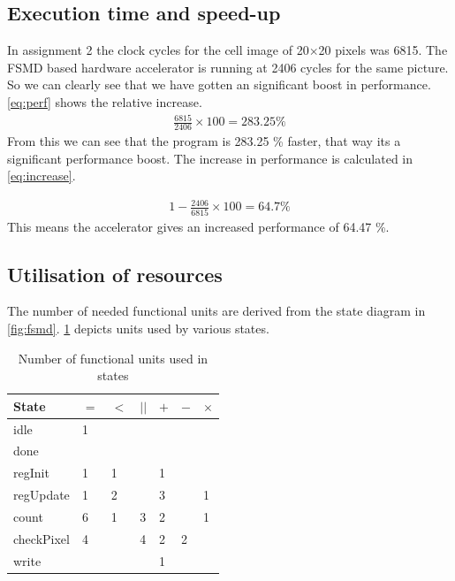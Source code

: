 \documentclass[a4paper, english]{article}
\numberwithin{equation}{section}
\begin{document}
\subsection{Execution time and speed-up}
In assignment 2 the clock cycles for the cell image of 20\(\times\)20 pixels was 6815. The FSMD based hardware accelerator is running at 2406 cycles for the same picture. So we can clearly see that we have gotten an significant boost in performance. \cref{eq:perf} shows the relative increase.
\begin{align}
\frac{6815}{2406} \times 100 = 283.25 \% \label{eq:perf}
\end{align}\newline
From this we can see that the program is 283.25 \% faster, that way its a significant performance boost. The increase in performance is calculated in \cref{eq:increase}.

\begin{align}
1 - \frac{2406}{6815} \times 100 = 64.7 \% \label{eq:increase}
\end{align}\newline
This means the accelerator gives an increased performance of 64.47 \%.

\subsection{Utilisation of resources}
The number of needed functional units are derived from the state diagram in \cref{fig:fsmd}. \cref{tbl:funcunits} depicts units used by various states.
\begin{table}[H]
    \centering
    \caption{Number of functional units used in states}\label{tbl:funcunits}
    \begin{tabular}{lllllll}
        \toprule
        State      & \(=\) & \(<\) & \(||\) & \(+\) & \(-\) & \(\times\) \\
        \midrule
        idle       & 1     &       &        &       &       &            \\
        done       &       &       &        &       &       &            \\
        regInit    & 1     & 1     &        & 1     &       &            \\
        regUpdate  & 1     & 2     &        & 3     &       & 1          \\
        count      & 6     & 1     & 3      & 2     &       & 1          \\
        checkPixel & 4     &       & 4      & 2     & 2     &            \\
        write      &       &       &        & 1     &       &            \\
        \bottomrule
    \end{tabular}
\end{table}
\end{document}
